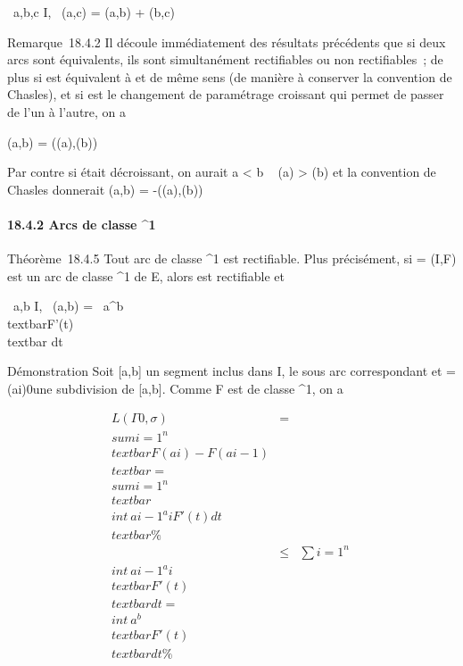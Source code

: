 \forall~a,b,c \in I, \ell\Gamma~(a,c) =
\ell\Gamma(a,b) + \ell\Gamma(b,c)

Remarque~18.4.2 Il découle immédiatement des résultats précédents que si
deux arcs sont équivalents, ils sont simultanément rectifiables ou non
rectifiables~; de plus si  est équivalent à  et
de même sens (de manière à conserver la convention de Chasles), et si \theta
est le changement de paramétrage croissant qui permet de passer de l'un
à l'autre, on a

\ell{}(a,b) = \ell{}(\theta(a),\theta(b))

Par contre si \theta était décroissant, on aurait a \textless{} b \rigtharrow~ \theta(a)
\textgreater{} \theta(b) et la convention de Chasles donnerait
\ell{}(a,b) = -\ell{}(\theta(a),\theta(b))

\paragraph{18.4.2 Arcs de classe ^1}

Théorème~18.4.5 Tout arc de classe ^1 est rectifiable. Plus
précisément, si \Gamma = (I,F) est un arc de classe ^1 de E,
alors \Gamma est rectifiable et

\forall~a,b \in I, \ell\Gamma~(a,b)
=\int ~
a^b\\textbar{}F'(t)\\textbar{}
dt

Démonstration Soit {[}a,b{]} un segment inclus dans I,  le
sous arc correspondant et \sigma = (ai)0\leqi\leqn une
subdivision de {[}a,b{]}. Comme F est de classe ^1, on a

\begin{align*} L(\Gamma0,\sigma)& =&
\\sum
i=1^n\\textbar{}F(a i) -
F(ai-1)\\textbar{} =
\\sum
i=1^n\\textbar{}
\\int  ~
ai-1^ai F'(t)
dt\\textbar{}\%& \\ & \leq&
\sum i=1^n~
\\int  ~
ai-1^ai
\\textbar{}F'(t)\\textbar{} dt =
\\int  ~
a^b\\textbar{}F'(t)\\textbar{}
dt \%& \\
\end{align*}

